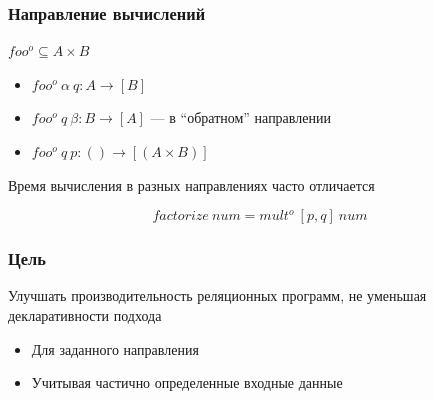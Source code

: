 \documentclass{beamer}
\begin{document}
\begin{frame}[fragile]
  \transwipe[direction=90]
  \frametitle{Направление вычислений}

\begin{center}
  $foo^o \subseteq A \times B$
\end{center}

\begin{itemize}
  \item $foo^o \ \alpha \ q : A \rightarrow [B]$
  \item $foo^o \ q \ \beta  : B \rightarrow [A]$ --- в ``обратном'' направлении
  \item $foo^o \ q \ p      : () \rightarrow [(A \times B)] $ 
\end{itemize}  
  
\pause  

\bigskip

Время вычисления в разных направлениях часто отличается

\pause 

$$
factorize \ num = mult^o \ [p, q] \ num 
$$
\end{frame}

\begin{frame}[fragile]
  \transwipe[direction=90]
  \frametitle{Цель}

Улучшать производительность реляционных программ, не уменьшая декларативности подхода

\begin{itemize}
  \item Для заданного направления
  \item Учитывая частично определенные входные данные
\end{itemize}
\end{frame}
\end{document}
